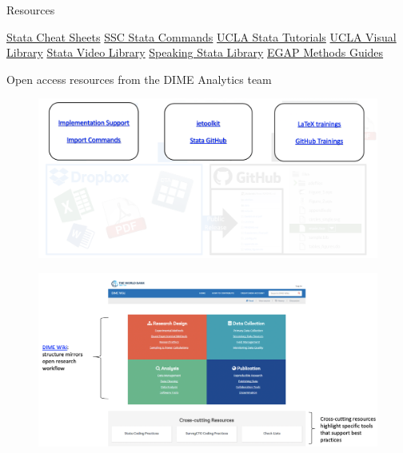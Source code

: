 \documentclass[aspectratio=169]{beamer}
\begin{document}
\begin{frame}{Resources}

\leavevmode 	\newline \underline{Stata Cheat Sheets}
\leavevmode 	\newline \underline{SSC Stata Commands}
\leavevmode 	\newline \underline{UCLA Stata Tutorials}
\leavevmode 	\newline \underline{UCLA Visual Library}
\leavevmode 	\newline \underline{Stata Video Library}
\leavevmode 	\newline \underline{Speaking Stata Library}
\leavevmode 	\newline \underline{EGAP Methods Guides}

\end{frame}


\begin{frame}{Open access resources from the DIME Analytics team}

\begin{figure}
	\centering
	\includegraphics[width=\linewidth]{img/Resources}
\end{figure}

\end{frame}


\begin{frame}

\begin{figure}
	\centering
	\includegraphics[width=\linewidth]{img/Resources2}
\end{figure}

\end{frame}
\end{document}
